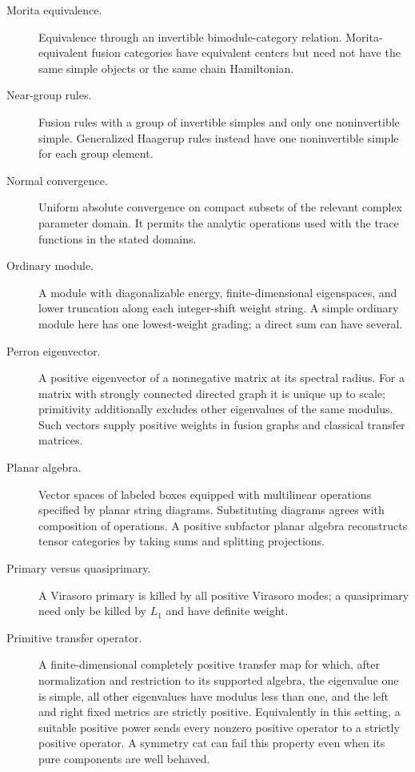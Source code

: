 \begin{description}
\item[Morita equivalence.]Equivalence through an invertible
bimodule-category relation. Morita-equivalent fusion categories
have equivalent centers but need not have the same simple objects
or the same chain Hamiltonian.

\item[Near-group rules.]Fusion rules with a group of invertible
simples and only one noninvertible simple. Generalized Haagerup
rules instead have one noninvertible simple for each group
element.

\item[Normal convergence.]Uniform absolute convergence on
compact subsets of the relevant complex parameter domain.
It permits the analytic operations used with the trace
functions in the stated domains.

\item[Ordinary module.]A module with diagonalizable energy,
finite-dimensional eigenspaces, and lower truncation along
each integer-shift weight string. A simple ordinary module
here has one lowest-weight grading; a direct sum can have several.

\item[Perron eigenvector.]A positive eigenvector of a nonnegative
matrix at its spectral radius. For a matrix with strongly connected
directed graph it is unique up to scale; primitivity additionally
excludes other eigenvalues of the same modulus. Such vectors supply
positive weights in fusion graphs and classical transfer matrices.

\item[Planar algebra.]Vector spaces of labeled boxes equipped
with multilinear operations specified by planar string diagrams.
Substituting diagrams agrees with composition of operations.
A positive subfactor planar algebra reconstructs tensor categories
by taking sums and splitting projections.

\item[Primary versus quasiprimary.]A Virasoro primary is killed by
all positive Virasoro modes; a quasiprimary need only be killed by
$L_1$ and have definite weight.

\item[Primitive transfer operator.]A finite-dimensional completely
positive transfer map for which, after normalization and restriction
to its supported algebra, the eigenvalue one is simple, all other
eigenvalues have modulus less than one, and the left and right
fixed metrics are strictly positive. Equivalently in this setting,
a suitable positive power sends every nonzero positive operator
to a strictly positive operator. A symmetry cat can fail this
property even when its pure components are well behaved.


\end{description}
